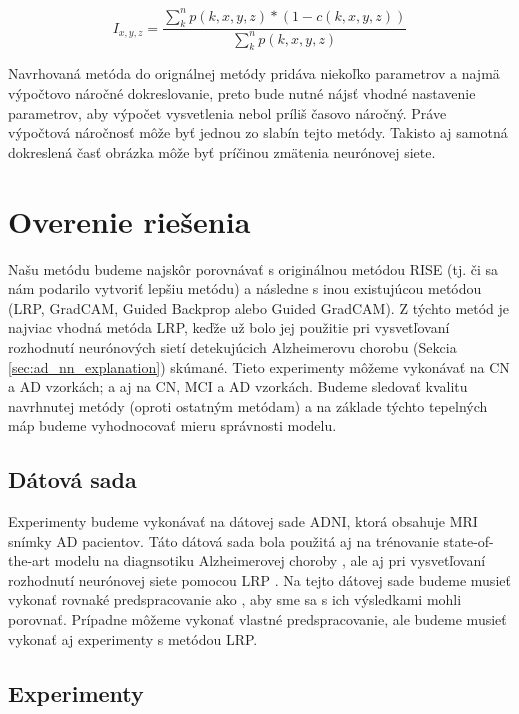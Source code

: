 \begin{equation} 
    I_{x, y, z} = \frac{\sum_{k}^{n} p(k, x, y, z) * (1 - c(k, x, y, z))}{\sum_{k}^{n} p(k, x, y, z)}
    \label{eq:risei_heatmap_1}
\end{equation}

Navrhovaná metóda do orignálnej metódy pridáva niekoľko parametrov a najmä výpočtovo náročné dokreslovanie, preto bude nutné nájsť vhodné nastavenie parametrov, aby výpočet vysvetlenia nebol príliš časovo náročný. Práve výpočtová náročnosť môže byť jednou zo slabín tejto metódy. Takisto aj samotná dokreslená časť obrázka môže byť príčinou zmätenia neurónovej siete.

\section{Overenie riešenia \label{sec:evaluation_design}}

Našu metódu budeme najskôr porovnávať s originálnou metódou RISE (tj. či sa nám podarilo vytvoriť lepšiu metódu) a následne s inou existujúcou metódou (LRP, GradCAM, Guided Backprop alebo Guided GradCAM). Z týchto metód je najviac vhodná metóda LRP, keďže už bolo jej použitie pri vysvetľovaní rozhodnutí neurónových sietí detekujúcich Alzheimerovu chorobu (Sekcia \ref{sec:ad_nn_explanation}) skúmané. Tieto experimenty môžeme vykonávať na CN a AD vzorkách; a aj na CN, MCI a AD vzorkách. Budeme sledovať kvalitu navrhnutej metódy (oproti ostatným metódam) a na základe týchto tepelných máp budeme vyhodnocovať mieru správnosti modelu.

\subsection{Dátová sada} Experimenty budeme vykonávať na dátovej sade ADNI, ktorá obsahuje MRI snímky AD pacientov. Táto dátová sada bola použitá aj na trénovanie state-of-the-art modelu na diagnsotiku Alzheimerovej choroby \cite{esmaeilzadeh2018end}, ale aj pri vysvetľovaní rozhodnutí neurónovej siete pomocou LRP \cite{bohle2019layer}. Na tejto dátovej sade budeme musieť vykonať rovnaké predspracovanie ako \citeauthor*{bohle2019layer}, aby sme sa s ich výsledkami mohli porovnať. Prípadne môžeme vykonať vlastné predspracovanie, ale budeme musieť vykonať aj experimenty s metódou LRP.

\subsection{Experimenty}

